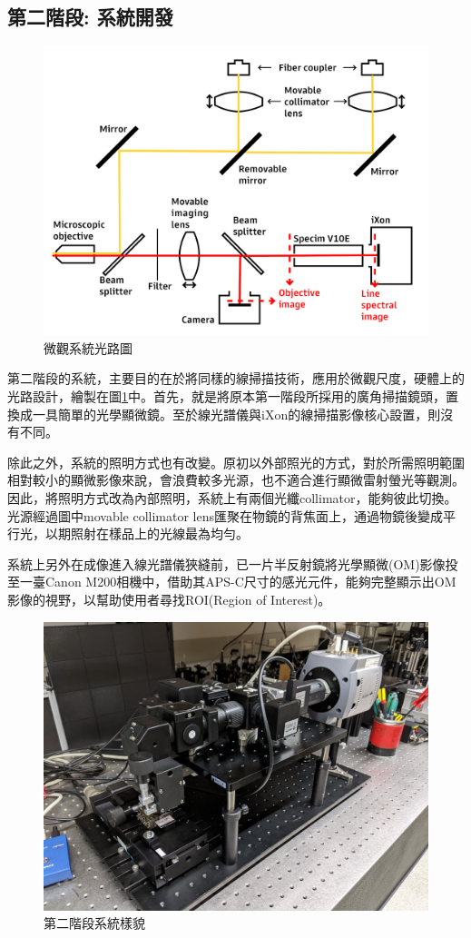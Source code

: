 \documentclass[12pt]{article}
\begin{document}
\subsection{第二階段: 系統開發}
\begin{figure}
    \centering
    \includegraphics[width = 0.9\linewidth]{lightPath2.jpg}
    \caption{微觀系統光路圖}
    \label{fig: micro path}
\end{figure}
第二階段的系統，主要目的在於將同樣的線掃描技術，應用於微觀尺度，硬體上的光路設計，繪製在圖\ref{fig: micro path}中。首先，就是將原本第一階段所採用的廣角掃描鏡頭，置換成一具簡單的光學顯微鏡。至於線光譜儀與iXon的線掃描影像核心設置，則沒有不同。

除此之外，系統的照明方式也有改變。原初以外部照光的方式，對於所需照明範圍相對較小的顯微影像來說，會浪費較多光源，也不適合進行顯微雷射螢光等觀測。
因此，將照明方式改為內部照明，系統上有兩個光纖collimator，能夠彼此切換。光源經過圖中movable collimator lens匯聚在物鏡的背焦面上，通過物鏡後變成平行光，以期照射在樣品上的光線最為均勻。

系統上另外在成像進入線光譜儀狹縫前，已一片半反射鏡將光學顯微(OM)影像投至一臺Canon M200相機中，借助其APS-C尺寸的感光元件，能夠完整顯示出OM影像的視野，以幫助使用者尋找ROI(Region of Interest)。
\begin{figure}
    \centering
    \includegraphics[width=\linewidth]{microSystemPixel3.jpg}
    \caption{第二階段系統樣貌}
\end{figure}
\end{document}
